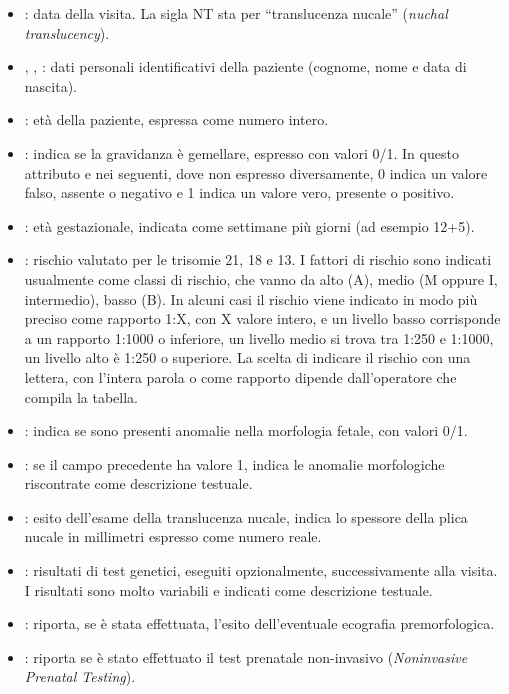 \begin{itemize}
\item {}: data della visita. La sigla NT sta per \enquote{translucenza nucale} (\emph{nuchal translucency}).
\item {}, , : dati personali identificativi della paziente (cognome, nome e data di nascita).
\item {}: età della paziente, espressa come numero intero.
\item {}: indica se la gravidanza è gemellare, espresso con valori 0/1.
In questo attributo e nei seguenti, dove non espresso diversamente, 0 indica un valore falso, assente o negativo e 1 indica un valore vero, presente o positivo.
\item {}: età gestazionale, indicata come settimane più giorni (ad esempio 12+5).
\item {}: rischio valutato per le trisomie 21, 18 e 13.
I fattori di rischio sono indicati usualmente come classi di rischio, che vanno da alto (A), medio (M oppure I, intermedio), basso (B).
In alcuni casi il rischio viene indicato in modo più preciso come rapporto 1:X, con X valore intero, e un livello basso corrisponde a un rapporto 1:1000 o inferiore, un livello medio si trova tra 1:250 e 1:1000, un livello alto è 1:250 o superiore.
La scelta di indicare il rischio con una lettera, con l'intera parola o come rapporto dipende dall'operatore che compila la tabella.
\item {}: indica se sono presenti anomalie nella morfologia fetale, con valori 0/1.
\item {}: se il campo precedente ha valore 1, indica le anomalie morfologiche riscontrate come descrizione testuale.
\item {}: esito dell'esame della translucenza nucale, indica lo spessore della plica nucale in millimetri espresso come numero reale.
\item {}: risultati di test genetici, eseguiti opzionalmente, successivamente alla visita. I risultati sono molto variabili e indicati come descrizione testuale.
\item {}: riporta, se è stata effettuata, l'esito dell'eventuale ecografia premorfologica.
\item {}: riporta se è stato effettuato il test prenatale non-invasivo (\emph{Noninvasive Prenatal Testing}).

\end{itemize}

